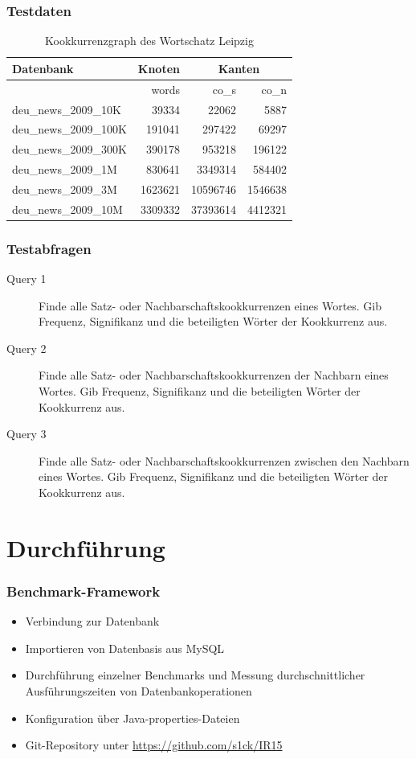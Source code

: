 \documentclass{beamer}
\begin{document}
\begin{frame}\frametitle{Testdaten}
	\begin{table}
	\begin{tabular}{|l|r|r|r|}
		\hline
		Datenbank & Knoten & \multicolumn{2}{|c|}{Kanten}\\
		\hline
		 & words & co\_{}s & co\_{}n \\
		\hline
		\hline
		deu\_{}news\_{}2009\_{}10K & 39334 & 22062 & 5887\\
		\hline
		deu\_{}news\_{}2009\_{}100K & 191041 & 297422 & 69297\\
		\hline
		deu\_{}news\_{}2009\_{}300K & 390178 & 953218 & 196122\\
		\hline
		deu\_{}news\_{}2009\_{}1M & 830641 & 3349314 & 584402\\
		\hline
		deu\_{}news\_{}2009\_{}3M & 1623621 & 10596746 & 1546638\\
		\hline
		deu\_{}news\_{}2009\_{}10M & 3309332 & 37393614 & 4412321\\
		\hline
	\end{tabular}
	\caption{Kookkurrenzgraph des Wortschatz Leipzig}
	\end{table}
\end{frame}

\begin{frame}\frametitle{Testabfragen}
\begin{description}
\item[Query 1]Finde alle Satz- oder Nachbarschaftskookkurrenzen eines Wortes. Gib Frequenz, Signifikanz und die beteiligten Wörter der Kookkurrenz aus.
\item[Query 2]Finde alle Satz- oder Nachbarschaftskookkurrenzen der Nachbarn eines Wortes. Gib Frequenz, Signifikanz und die beteiligten Wörter der Kookkurrenz aus.
\item[Query 3]Finde alle Satz- oder Nachbarschaftskookkurrenzen zwischen den Nachbarn eines Wortes. Gib Frequenz, Signifikanz und die beteiligten Wörter der Kookkurrenz aus.
\end{description}
\end{frame}

\section{Durchführung}
\begin{frame}\frametitle{Benchmark-Framework} 
	\begin{itemize}
		\item Verbindung zur Datenbank
		\item Importieren von Datenbasis aus MySQL
		\item Durchführung einzelner Benchmarks und Messung durchschnittlicher Ausführungszeiten von Datenbankoperationen
		\item Konfiguration über Java-properties-Dateien
		\item Git-Repository unter \href{https://github.com/s1ck/IR15}{https://github.com/s1ck/IR15}
	\end{itemize} 
\end{frame}
\end{document}
